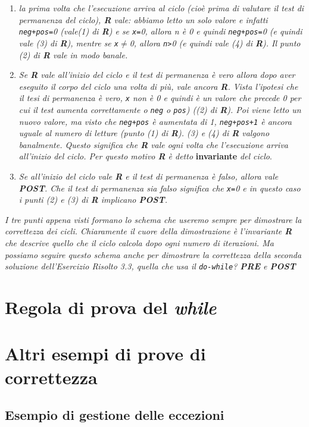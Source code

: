 \begin{enumerate}


\item
\textit{la prima volta che l'esecuzione arriva al ciclo (cioè prima di valutare il test di permanenza del ciclo), \textbf{R} vale:
abbiamo letto un solo valore e infatti \texttt{neg+pos=}0 (vale(1) di \textbf{R}) e se \texttt{x=}0, allora \textit{n} è 0 e quindi \texttt{neg+pos=}0 (e quindi vale (3) di \textbf{R}), mentre se \texttt{x$\neq$}0, allora \texttt{n>}0 (e quindi vale (4) di \textbf{R}).
Il punto (2) di \textbf{R} vale in modo banale.}

\item
\textit{Se \textbf{R} vale all'inizio del ciclo e il test di permanenza è vero allora dopo aver eseguito il corpo del ciclo una volta di più, vale ancora \textbf{R}.
Vista l'ipotesi che il tesi di permanenza è vero, \texttt{x} non è 0 e quindi è un valore che precede 0 per cui il test aumenta correttamente o \texttt{neg} o \texttt{pos}) ((2) di \textbf{R}).
Poi viene letto un nuovo valore, ma visto che \texttt{neg+pos} è aumentata di 1, \texttt{neg+pos+1} è ancora uguale al numero di letture (punto (1) di \textbf{R}).
(3) e (4) di \textbf{R} valgono banalmente.
Questo significa che \textbf{R} vale ogni volta che l'esecuzione arriva all'inizio del ciclo.
Per questo motivo \textbf{R} è detto} \textbf{invariante} \textit{del ciclo}.

\item
\textit{Se all'inizio del ciclo vale \textbf{R} e il test di permanenza è falso, allora vale \textbf{POST}.
Che il test di permanenza sia falso significa che \texttt{x=}0 e in questo caso i punti (2) e (3) di \textbf{R} implicano \textbf{POST}.}

\end{enumerate}

\textit{I tre punti appena visti formano lo schema che useremo sempre per dimostrare la correttezza dei cicli.
Chiaramente il cuore della dimostrazione è l'invariante \textbf{R} che descrive quello che il ciclo calcola dopo ogni numero di iterazioni.
Ma possiamo seguire questo schema anche per dimostrare la correttezza della seconda soluzione 
dell'Esercizio Risolto 3.3, quella che usa il \texttt{do-while}?
\textbf{PRE} e \textbf{POST}}



\section{Regola di prova del \textit{while}}

\section{Altri esempi di prove di correttezza}

\subsection{Esempio di gestione delle eccezioni}